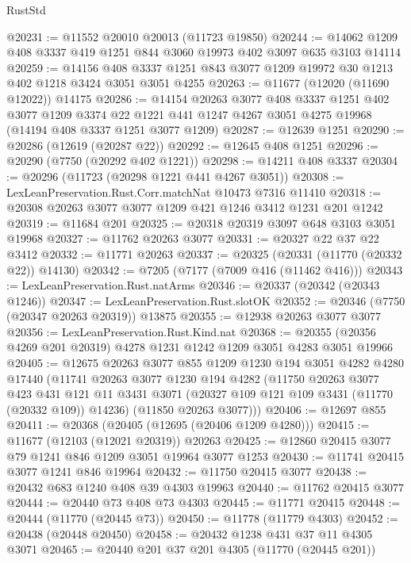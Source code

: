 \begin{lexlean}{RustStd}
\begin{coremodule}
@20231 := @11552 @20010 @20013 (@11723 @19850)
@20244 := @14062 @1209 @408 @3337 @419 @1251 @844 @3060 @19973 @402 @3097 @635 @3103 @14114
@20259 := @14156
    @408
    @3337
    @1251
    @843
    @3077
    @1209
    @19972
    @30
    @1213
    @402
    @1218
    @3424
    @3051
    @3051
    @4255
@20263 := @11677 (@12020 (@11690 @12022)) @14175
@20286 := @14154
    @20263
    @3077
    @408
    @3337
    @1251
    @402
    @3077
    @1209
    @3374
    @22
    @1221
    @441
    @1247
    @4267
    @3051
    @4275
    @19968
    (@14194 @408 @3337 @1251 @3077 @1209)
@20287 := @12639 @1251
@20290 := @20286 (@12619 (@20287 @22))
@20292 := @12645 @408 @1251
@20296 := @20290 (@7750 (@20292 @402 @1221))
@20298 := @14211 @408 @3337
@20304 := @20296 (@11723 (@20298 @1221 @441 @4267 @3051))
@20308 := LexLeanPreservation.Rust.Corr.matchNat @10473 @7316 @11410
@20318 := @20308 @20263 @3077 @3077 @1209 @421 @1246 @3412 @1231 @201 @1242
@20319 := @11684 @201
@20325 := @20318 @20319 @3097 @648 @3103 @3051 @19968
@20327 := @11762 @20263 @3077
@20331 := @20327 @22 @37 @22 @3412
@20332 := @11771 @20263
@20337 := @20325 (@20331 (@11770 (@20332 @22)) @14130)
@20342 := @7205 (@7177 (@7009 @416 (@11462 @416)))
@20343 := LexLeanPreservation.Rust.natArms
@20346 := @20337 (@20342 (@20343 @1246))
@20347 := LexLeanPreservation.Rust.slotOK
@20352 := @20346 (@7750 (@20347 @20263 @20319)) @13875
@20355 := @12938 @20263 @3077 @3077
@20356 := LexLeanPreservation.Rust.Kind.nat
@20368 := @20355 (@20356 @4269 @201 @20319) @4278 @1231 @1242 @1209 @3051 @4283 @3051 @19966
@20405 := @12675
    @20263
    @3077
    @855
    @1209
    @1230
    @194
    @3051
    @4282
    @4280
    @17440
    (@11741
      @20263
      @3077
      @1230
      @194
      @4282
      (@11750
        @20263
        @3077
        @423
        @431
        @121
        @11
        @3431
        @3071
        (@20327 @109 @121 @109 @3431 (@11770 (@20332 @109)) @14236)
        (@11850 @20263 @3077)))
@20406 := @12697 @855
@20411 := @20368 (@20405 (@12695 (@20406 @1209 @4280)))
@20415 := @11677 (@12103 (@12021 @20319)) @20263
@20425 := @12860 @20415 @3077 @79 @1241 @846 @1209 @3051 @19964 @3077 @1253
@20430 := @11741 @20415 @3077 @1241 @846 @19964
@20432 := @11750 @20415 @3077
@20438 := @20432 @683 @1240 @408 @39 @4303 @19963
@20440 := @11762 @20415 @3077
@20444 := @20440 @73 @408 @73 @4303
@20445 := @11771 @20415
@20448 := @20444 (@11770 (@20445 @73))
@20450 := @11778 (@11779 @4303)
@20452 := @20438 (@20448 @20450)
@20458 := @20432 @1238 @431 @37 @11 @4305 @3071
@20465 := @20440 @201 @37 @201 @4305 (@11770 (@20445 @201))

\end{coremodule}
\end{lexlean}
